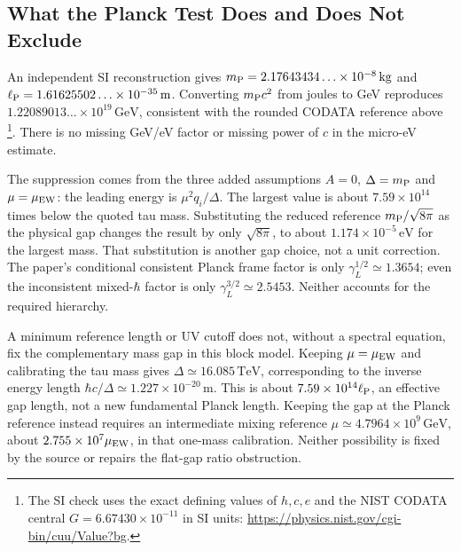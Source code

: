 \subsection{What the Planck Test Does and Does Not Exclude}
\label{v480:planck-assumption-diagnosis}

An independent SI reconstruction gives
$m_{\rm P}=2.17643434\ldots\times10^{-8}\,\mathrm{kg}$ and
$\ell_{\rm P}=1.61625502\ldots\times10^{-35}\,\mathrm{m}$.
Converting $m_{\rm P}c^2$ from joules to GeV reproduces
$1.22089013\ldots\times10^{19}\,\mathrm{GeV}$, consistent with
the rounded CODATA reference above
\footnote{The SI check uses the exact defining values of $h,c,e$
and the NIST CODATA central $G=6.67430\times10^{-11}$ in SI units:
\url{https://physics.nist.gov/cgi-bin/cuu/Value?bg}.}.
There is no missing GeV/eV factor or missing power of $c$ in the
micro-eV estimate.

The suppression comes from the three added assumptions
$A=0$, $\Delta=m_{\rm P}$ and $\mu=\mu_{\rm EW}$:
the leading energy is $\mu^2q_i/\Delta$. The largest value is
about $7.59\times10^{14}$ times below the quoted tau mass.
Substituting the reduced reference $m_{\rm P}/\sqrt{8\pi}$ as
the physical gap changes the result by only $\sqrt{8\pi}$,
to about $1.174\times10^{-5}\,\mathrm{eV}$ for the largest mass.
That substitution is another gap choice, not a unit correction.
The paper's conditional consistent Planck frame factor is only
$\gamma_L^{1/2}\simeq1.3654$; even the inconsistent mixed-$\hbar$
factor is only $\gamma_L^{3/2}\simeq2.5453$.
Neither accounts for the required hierarchy.

A minimum reference length or UV cutoff does not, without a spectral
equation, fix the complementary mass gap in this block model.
Keeping $\mu=\mu_{\rm EW}$ and calibrating the tau mass gives
$\Delta\simeq16.085\,\mathrm{TeV}$, corresponding to the inverse
energy length $\hbar c/\Delta\simeq1.227\times10^{-20}\,\mathrm m$.
This is about $7.59\times10^{14}\ell_{\rm P}$, an effective gap
length, not a new fundamental Planck length. Keeping the gap at the
Planck reference instead requires an intermediate mixing reference
$\mu\simeq4.7964\times10^9\,\mathrm{GeV}$, about
$2.755\times10^7\mu_{\rm EW}$, in that one-mass calibration.
Neither possibility is fixed by the source or repairs the flat-gap
ratio obstruction.

